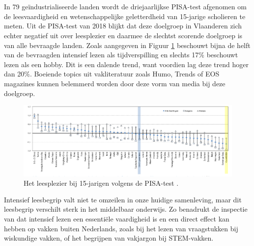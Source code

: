 \section{}%
\label{sec:probleemstelling}

In 79 geïndustrialiseerde landen wordt de driejaarlijkse PISA-test afgenomen om de leesvaardigheid en wetenschappelijke geletterdheid van 15-jarige scholieren te meten. Uit de PISA-test van 2018 blijkt dat deze doelgroep in Vlaanderen zich echter negatief uit over leesplezier en daarmee de slechtst scorende doelgroep is van alle bevraagde landen. Zoals aangegeven in Figuur \ref{img:oeso-leesplezier} beschouwt bijna de helft van de bevraagden intensief lezen als tijdverspilling en slechts 17\% beschouwt lezen als een hobby. Dit is een dalende trend, want voordien lag deze trend hoger dan 20\%. Boeiende topics uit vakliteratuur zoals Humo, Trends of EOS magazines kunnen belemmerd worden door deze vorm van media bij deze doelgroep.

\begin{figure}[H]
	\begin{center}
		\includegraphics[width=\linewidth]{img/oeso-graphic-leesplezier.png}
	\end{center}
	\caption{Het leesplezier bij 15-jarigen volgens de PISA-test \autocite{DeMeyer2019}.}
	\label{img:oeso-leesplezier}
\end{figure}


\medspace


Intensief leesbegrip valt niet te omzeilen in onze huidige samenleving, maar dit leesbegrip verschilt sterk in het middelbaar onderwijs. Zo benadrukt de inspectie van \textcite{Vlaanderen2020} dat intensief lezen een essentiële vaardigheid is en een direct effect kan hebben op vakken buiten Nederlands, zoals bij het lezen van vraagstukken bij wiskundige vakken, of het begrijpen van vakjargon bij STEM-vakken. 

